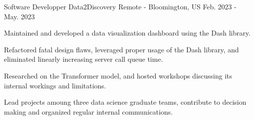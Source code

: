 

\begin{cventries}

  \cventry
    {Software Developper} %
    {Data2Discovery} %
    {Remote - Bloomington, US} %
    {Feb. 2023 - May. 2023} %
    {
      \begin{cvitems} %
        \item {Maintained and developed a data visualization dashboard using the Dash library.}
        \item {Refactored fatal design flaws, leveraged proper usage of the Dash library, and eliminated linearly increasing server call queue time.}
        \item {Researched on the Transformer model, and hosted workshops discussing its internal workings and limitations.}
        \item {Lead projects amoung three data science graduate teams, contribute to decision making and organized regular internal communications.}
      \end{cvitems}
    }

\end{cventries}
